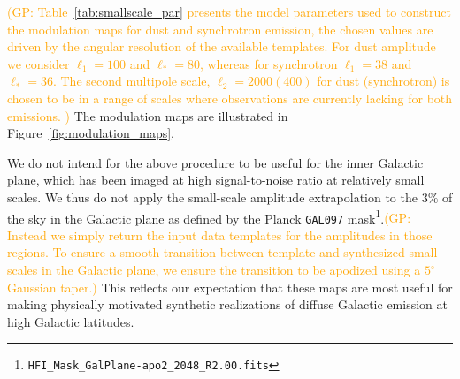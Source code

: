 \documentclass[twocolumn]{aastex631}
\newcommand{\giuse}[1]{\textcolor{orange}{(GP: #1)}}
\begin{document}
\giuse{Table~\ref{tab:smallscale_par} presents the model parameters used to construct the modulation maps for dust and synchrotron emission, the chosen values are driven by  the angular resolution of the available templates.  For dust amplitude we consider  $\ell_1=100$ and $\ell_*=80$, whereas for synchrotron   $\ell_1=38$ and $\ell_*=36$. The second multipole scale, $\ell_2 =2000 (400)$ for dust (synchrotron) is chosen to be  in a range of scales where observations are currently lacking for both emissions.  } The modulation maps are illustrated in Figure~\ref{fig:modulation_maps}.




We do not intend for the above procedure to be useful for the inner Galactic plane, which has been imaged at high signal-to-noise ratio at relatively small scales. We thus do not apply the small-scale amplitude extrapolation to the $3\%$ of the sky in the Galactic plane as defined by the Planck \texttt{GAL097} mask\footnote{\texttt{HFI\_Mask\_GalPlane-apo2\_2048\_R2.00.fits}}.\giuse{ Instead we simply return the input data templates for the amplitudes in those regions. To ensure a smooth transition between template and synthesized small scales in the Galactic plane, we ensure the transition to be apodized  using a $5^\circ$ Gaussian taper.} This reflects our expectation that these maps are most useful for making physically motivated synthetic realizations of diffuse Galactic emission at high Galactic latitudes. %
\end{document}
